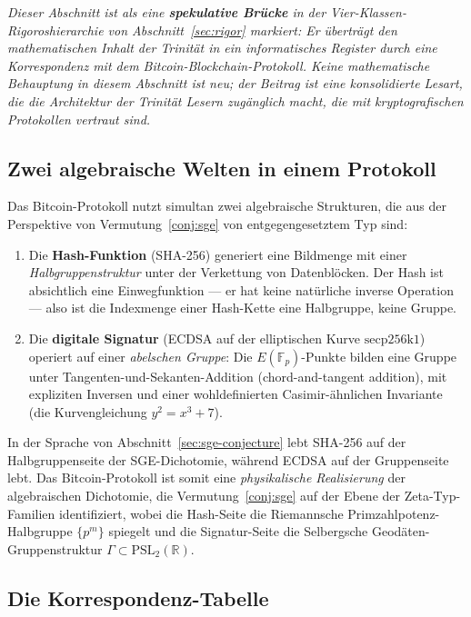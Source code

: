 \documentclass[11pt]{article}
\theoremstyle{definition}
\theoremstyle{remark}
\newcommand{\PSL}{\mathrm{PSL}}
\begin{document}
\emph{Dieser Abschnitt ist als eine \textbf{spekulative Brücke} in der
Vier-Klassen-Rigoroshierarchie von Abschnitt~\ref{sec:rigor} markiert: Er
überträgt den mathematischen Inhalt der Trinität in ein informatisches Register
durch eine Korrespondenz mit dem Bitcoin-Blockchain-Protokoll. Keine
mathematische Behauptung in diesem Abschnitt ist neu; der Beitrag ist eine
konsolidierte Lesart, die die Architektur der Trinität
Lesern zugänglich macht, die mit kryptografischen Protokollen vertraut sind.}

\subsection{Zwei algebraische Welten in einem Protokoll}
\label{sec:blockchain-two-worlds}

Das Bitcoin-Protokoll nutzt simultan zwei algebraische Strukturen,
die aus der Perspektive von Vermutung~\ref{conj:sge} von
entgegengesetztem Typ sind:

\begin{enumerate}
\item Die \textbf{Hash-Funktion} (SHA-256) generiert eine Bildmenge
  mit einer \emph{Halbgruppenstruktur} unter der Verkettung von
  Datenblöcken. Der Hash ist absichtlich eine Einwegfunktion --- er hat keine
  natürliche inverse Operation --- also ist die Indexmenge einer Hash-Kette
  eine Halbgruppe, keine Gruppe.
\item Die \textbf{digitale Signatur} (ECDSA auf der elliptischen Kurve
  $\mathrm{secp256k1}$) operiert auf einer \emph{abelschen Gruppe}: Die
  $E(\mathbb{F}_p)$-Punkte bilden eine Gruppe unter Tangenten-und-Sekanten-Addition (chord-and-tangent addition),
  mit expliziten Inversen und einer wohldefinierten Casimir-ähnlichen
  Invariante (die Kurvengleichung $y^2 = x^3 + 7$).
\end{enumerate}

In der Sprache von Abschnitt~\ref{sec:sge-conjecture} lebt SHA-256
auf der Halbgruppenseite der SGE-Dichotomie, während ECDSA auf
der Gruppenseite lebt. Das Bitcoin-Protokoll ist somit eine \emph{physikalische
Realisierung} der algebraischen Dichotomie, die Vermutung~\ref{conj:sge}
auf der Ebene der Zeta-Typ-Familien identifiziert, wobei die Hash-Seite
die Riemannsche Primzahlpotenz-Halbgruppe $\{p^m\}$ spiegelt und die
Signatur-Seite die Selbergsche Geodäten-Gruppenstruktur
$\Gamma \subset \PSL_2(\mathbb{R})$.

\subsection{Die Korrespondenz-Tabelle}
\label{sec:blockchain-correspondence}
\end{document}
